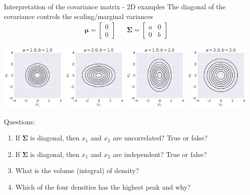 \begin{frame}{Interpretation of the covariance matrix - 2D examples}
	The diagonal of the covariance controls the scaling/marginal variances
	\begin{align}
		\bm{\mu} = \begin{bmatrix}0\\ 0\end{bmatrix} && \bm{\Sigma} = \begin{bmatrix}a& 0\\ 0 & b \end{bmatrix}
	\end{align}

	\begin{center}
	\includegraphics[width=0.24\textwidth]{gauss_scaling0.png}
	\includegraphics[width=0.24\textwidth]{gauss_scaling1.png}
	\includegraphics[width=0.24\textwidth]{gauss_scaling2.png}
	\includegraphics[width=0.24\textwidth]{gauss_scaling3.png}
	\end{center}
	\vspace*{-0.5cm}

	\pause
	
	Questions:
	\begin{enumerate}
		\item If $\bm{\Sigma}$ is diagonal, then $x_1$ and $x_2$ are uncorrelated? True or false?
		\item If $\bm{\Sigma}$ is diagonal, then $x_1$ and $x_2$ are independent? True or false?
		\item What is  the volume (integral) of density?
		\item Which of the four densities has the highest peak and why?
	\end{enumerate}
\end{frame}


